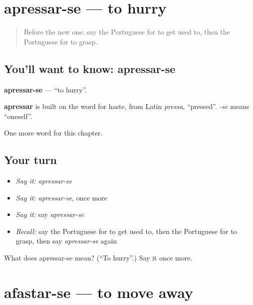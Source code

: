 \section[apressar-se]{apressar-se — to hurry}

\label{lesson:PT-C177-apressar-se}



\begin{quote}
Before the new one: say the Portuguese for to get used to, then the Portuguese for to grasp.
\end{quote}

\subsection*{You'll want to know: apressar-se}
\textbf{apressar-se} — \textquotedblleft{}to hurry\textquotedblright{}.

\begin{cousinweb}
\textbf{apressar} is built on the word for haste, from Latin \emph{pressa}, \textquotedblleft{}pressed\textquotedblright{}. \emph{-se} means \textquotedblleft{}oneself\textquotedblright{}.
\end{cousinweb}

\begin{grammarlens}[title={What you've built}]
One more word for this chapter.
\end{grammarlens}

\subsection*{Your turn}
\begin{itemize}
\raggedright
  \item \emph{Say it:} \emph{apressar-se}
  \item \emph{Say it:} \emph{apressar-se}, once more
  \item \emph{Say it:} say \emph{apressar-se}
  \item \emph{Recall:} say the Portuguese for to get used to, then the Portuguese for to grasp, then say \emph{apressar-se} again
\end{itemize}

\begin{tcolorbox}[breakable,colback=teal!4,colframe=teal!35!black,title={Before you move on}]
What does apressar-se mean? (\textquotedblleft{}To hurry\textquotedblright{}.) Say it once more.
\end{tcolorbox}
\section[afastar-se]{afastar-se — to move away}

